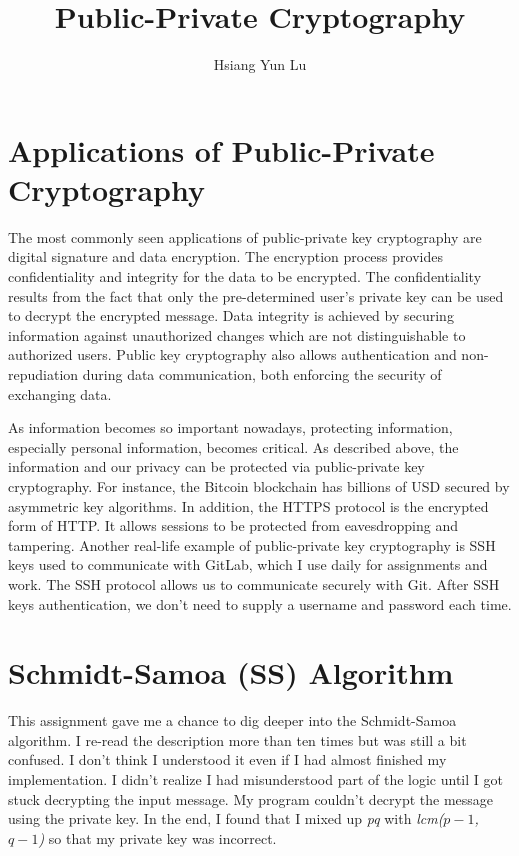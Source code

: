 \documentclass[12pt]{article}
\title{Public-Private Cryptography}
\author{Hsiang Yun Lu}
\begin{document}
\maketitle

\section{Applications of Public-Private Cryptography}

The most commonly seen applications of public-private key cryptography are  digital signature and data encryption. The encryption process provides confidentiality and integrity for the data to be encrypted. The confidentiality results from the fact that only the pre-determined user’s private key can be used to decrypt the encrypted message. Data integrity is achieved by securing information against unauthorized changes which are not distinguishable to authorized users. Public key cryptography also allows authentication and non-repudiation during data communication, both enforcing the security of exchanging data. 

As information becomes so important nowadays, protecting information, especially personal information, becomes critical. As described above, the information and our privacy can be protected via public-private key cryptography. For instance, the Bitcoin blockchain has billions of USD secured by asymmetric key algorithms. In addition, the HTTPS protocol is the encrypted form of HTTP. It allows sessions to be protected from eavesdropping and tampering. Another real-life example of public-private key cryptography is SSH keys used to communicate with GitLab, which I use daily for assignments and work. The SSH protocol allows us to communicate securely with Git. After SSH keys authentication, we don’t need to supply a username and password each time.

\section{Schmidt-Samoa (SS) Algorithm}

This assignment gave me a chance to dig deeper into the Schmidt-Samoa algorithm. I re-read the description more than ten times but was still a bit confused. I don't think I understood it even if I had almost finished my implementation. I didn't realize I had misunderstood part of the logic until I got stuck decrypting the input message. My program couldn't decrypt the message using the private key. In the end, I found that I mixed up \textit{pq} with \textit{lcm($p-1$, $q-1$)} so that my private key was incorrect. 
\end{document}
